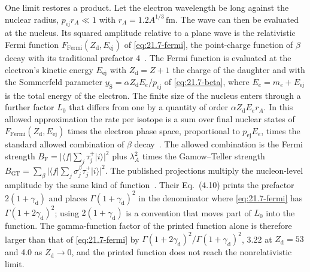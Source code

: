 One limit restores a product. Let the electron wavelength be long against the nuclear radius, $p_{\mathrm{ej}}r_A \ll 1$ with $r_A = 1.2A^{1/3}\,\mathrm{fm}$. The wave can then be evaluated at the nucleus. Its squared amplitude relative to a plane wave is the relativistic Fermi function $F_{\mathrm{Fermi}}(Z_{\mathrm{d}}, E_{\mathrm{ej}})$ of \cref{eq:21.7-fermi}, the point-charge function of $\beta$ decay with its traditional prefactor 4~\cite[Eq.~(6)]{hayen2018high}. The Fermi function is evaluated at the electron's kinetic energy $E_{\mathrm{ej}}$ with $Z_{\mathrm{d}} = Z + 1$ the charge of the daughter and with the Sommerfeld parameter $y_{\mathrm{S}} = \alpha Z_{\mathrm{d}}E_e/p_{\mathrm{ej}}$ of \cref{eq:21.7-beta}, where $E_e = m_e + E_{\mathrm{ej}}$ is the total energy of the electron. The finite size of the nucleus enters through a further factor $L_0$ that differs from one by a quantity of order $\alpha Z_{\mathrm{d}}E_er_A$. In this allowed approximation the rate per isotope is a sum over final nuclear states of $F_{\mathrm{Fermi}}(Z_{\mathrm{d}}, E_{\mathrm{ej}})$ times the electron phase space, proportional to $p_{\mathrm{ej}}E_e$, times the standard allowed combination of $\beta$ decay~\cite[Sect.~I]{hayen2018high}. The allowed combination is the Fermi strength $B_{\mathrm{F}} = |\langle f|\sum_j\tau^+_j|i\rangle|^2$ plus $\lambda_A^2$ times the Gamow--Teller strength $B_{\mathrm{GT}} = \sum_\beta|\langle f|\sum_j\sigma^\beta_j\tau^+_j|i\rangle|^2$. The published projections multiply the nucleon-level amplitude by the same kind of function~\cite[Eq.~(4.9)]{dror2020absorption}. Their Eq.~(4.10) prints the prefactor $2(1 + \gamma_{\mathrm{d}})$ and places $\Gamma(1 + \gamma_{\mathrm{d}})^2$ in the denominator where \cref{eq:21.7-fermi} has $\Gamma(1 + 2\gamma_{\mathrm{d}})^2$; using $2(1 + \gamma_{\mathrm{d}})$ is a convention that moves part of $L_0$ into the function. The gamma-function factor of the printed function alone is therefore larger than that of \cref{eq:21.7-fermi} by $\Gamma(1 + 2\gamma_{\mathrm{d}})^2/\Gamma(1 + \gamma_{\mathrm{d}})^2$, 3.22 at $Z_{\mathrm{d}} = 53$ and 4.0 as $Z_{\mathrm{d}} \to 0$, and the printed function does not reach the nonrelativistic limit.

